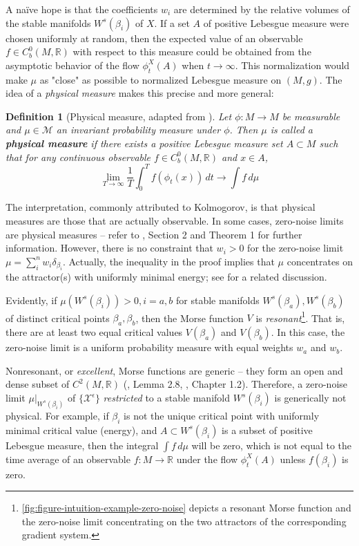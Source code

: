 \documentclass[12pt]{article}
\newtheorem{definition}[theorem]{Definition}
\newcommand\colorAutoref[1]{{\hypersetup{linkcolor=blue}\autoref{#1}}}  %
\begin{document}
A naïve hope is that the coefficients $w_i$ are determined by the relative volumes of the stable manifolds $W^s(\beta_i)$ of $X$. If a set $A$ of positive Lebesgue measure were chosen uniformly at random, then the expected value of an observable $f\in C^0_b(M,\mathbb{R})$ with respect to this measure could be obtained from the asymptotic behavior of the flow $\phi_t^X(A)$ when $t\rightarrow\infty$. This normalization would make $\mu$ as "close" as possible to normalized Lebesgue measure on $(M,g)$. The idea of a \textit{physical measure} makes this precise and more general:
\begin{definition}[Physical measure, adapted from \cite{young2002srb}]
    Let $\phi:M \rightarrow M$ be measurable and $\mu \in \mathcal{M}$ an invariant probability measure under $\phi$. Then $\mu$ is called a \textbf{\textit{physical measure}} if there exists a positive Lebesgue measure set $A \subset M$ such that for any continuous observable $f\in C^0_b(M,\mathbb{R})$ and $x \in A$,
    \begin{equation*}
        \lim_{T \rightarrow \infty} \frac{1}{T}\int_0^T f(\phi_t(x))\,dt \rightarrow \int f \, d\mu
    \end{equation*}
\end{definition}
The interpretation, commonly attributed to Kolmogorov, is that physical measures are those that are actually observable. In some cases, zero-noise limits are physical measures -- refer to \cite{young2002srb}, Section 2 and Theorem 1 for further information. However, there is no constraint that $w_i > 0$ for the zero-noise limit $\mu = \sum_i^n w_i \delta_{\beta_i}$. Actually, the inequality in the proof implies that $\mu$ concentrates on the attractor(s) with uniformly minimal energy; see \cite{hwang1980laplace} for a related discussion.

Evidently, if $\mu(W^s(\beta_i)) > 0, i=a,b$ for stable manifolds $W^s(\beta_a), W^s(\beta_b)$ of distinct critical points $\beta_a, \beta_b$, then the Morse function $V$ is \textit{resonant}\footnote{\colorAutoref{fig:figure-intuition-example-zero-noise} depicts a resonant Morse function and the zero-noise limit concentrating on the two attractors of the corresponding gradient system.}. That is, there are at least two equal critical values $V(\beta_a)$ and $V(\beta_b)$. In this case, the zero-noise limit is a uniform probability measure with equal weights $w_a$ and $w_b$.

Nonresonant, or \textit{excellent}, Morse functions are generic -- they form an open and dense subset of $C^{2}(M, \mathbb{R})$ (\cite{milnor2025lectures}, Lemma 2.8, \cite{nicolaescu2007invitation}, Chapter 1.2). Therefore, a zero-noise limit $\mu|_{W^s(\beta_i)}$ of $\{ \mathcal{X}^{\epsilon}\}$ \textit{restricted} to a stable manifold $W^s(\beta_i)$ is generically not physical. For example, if $\beta_i$ is not the unique critical point with uniformly minimal critical value (energy), and $A \subset W^s(\beta_i)$ is a subset of positive Lebesgue measure, then the integral $\int f \, d\mu$ will be zero, which is not equal to the time average of an observable $f: M \rightarrow \mathbb{R}$ under the flow $\phi_t^X(A)$ unless $f(\beta_i)$ is zero.
\end{document}
